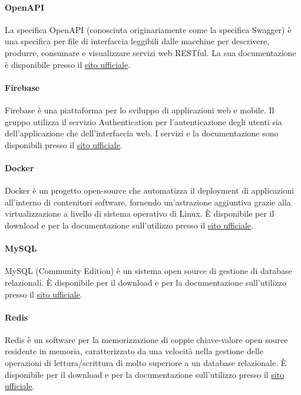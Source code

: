 \paragraph{OpenAPI}
La specifica OpenAPI (conosciuta originariamente come la specifica Swagger) è una specifica per file di interfaccia leggibili dalle macchine per descrivere, produrre, consumare e visualizzare servizi web RESTful.
La sua documentazione è disponibile presso il \href{https://www.openapis.org/}{sito ufficiale}. 

\paragraph{Firebase}
Firebase è una piattaforma per lo sviluppo di applicazioni web e mobile. Il gruppo utilizza il servizio Authentication per l'autenticazione degli utenti sia dell'applicazione che dell'interfaccia web.
I servizi e la documentazione sono disponibili presso il \href{https://firebase.google.com/?hl=it}{sito ufficiale}.

\paragraph{Docker}
Docker è un progetto open-source che automatizza il deployment di applicazioni all'interno di contenitori software, fornendo un'astrazione aggiuntiva grazie alla virtualizzazione a livello di sistema operativo di Linux.
È disponibile per il download e per la documentazione sull'utilizzo presso il \href{https://www.docker.com/}{sito ufficiale}.

\paragraph{MySQL}
MySQL (Community Edition) è un sistema open source di gestione di database relazionali.
È disponibile per il download e per la documentazione sull'utilizzo presso il \href{https://www.mysql.com/it/}{sito ufficiale}.

\paragraph{Redis}
Redis è un software per la memorizzazione di coppie chiave-valore open source residente in memoria, caratterizzato da una velocità nella gestione delle operazioni di lettura/scrittura di molto superiore a un database relazionale.
È disponibile per il download e per la documentazione sull'utilizzo presso il \href{https://redis.io/}{sito ufficiale}.

